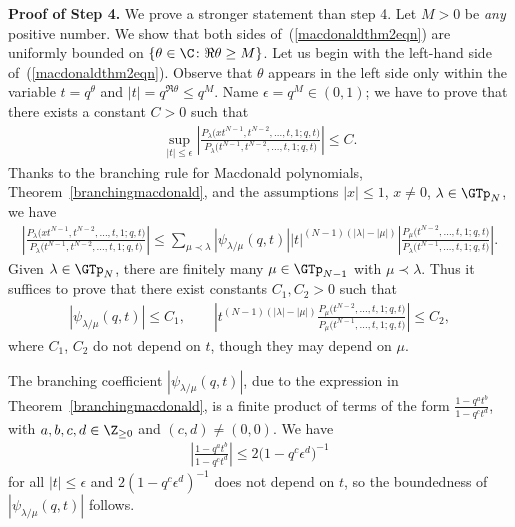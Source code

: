 \textbf{Proof of Step 4.} We prove a stronger statement than step 4. Let $M > 0$ be \textit{any} positive number. We show that both sides of~(\ref{macdonaldthm2eqn}) are uniformly bounded on $\{\theta\in\C\colon \Re\theta \geq M\}$. Let us begin with the left-hand side of~(\ref{macdonaldthm2eqn}). Observe that $\theta$ appears in the left side only within the variable $t = q^{\theta}$ and $|t| = q^{\Re\theta} \leq q^M$. Name $\epsilon = q^M\in (0, 1)$; we have to prove that there exists a constant $C > 0$ such that
\begin{gather*}
\sup_{|t| \leq \epsilon}{\left| \frac{P_{\lambda}\big(xt^{N-1}, t^{N-2}, \dots, t, 1; q, t\big)}{P_{\lambda}\big(t^{N-1}, t^{N-2}, \dots, t, 1; q, t\big)} \right|} \leq C.
\end{gather*}
Thanks to the branching rule for Macdonald polynomials, Theorem~\ref{branchingmacdonald}, and the assumptions $|x|\leq 1$, $x \neq 0$, $\lambda\in\GTp_N$, we have
\begin{gather*}
\left| \frac{P_{\lambda}\big(xt^{N-1}, t^{N-2}, \dots, t, 1; q, t\big)}{P_{\lambda}\big(t^{N-1}, t^{N-2}, \dots, t, 1; q, t\big)} \right| \leq \sum_{\mu\prec\lambda}{|\psi_{\lambda/\mu}(q, t)| |t|^{(N-1)(|\lambda| - |\mu|)} \left| \frac{P_{\mu}\big(t^{N-2}, \dots, t, 1; q, t\big)}{P_{\lambda}\big(t^{N-1}, \dots, t, 1; q, t\big)} \right| }.
\end{gather*}
Given $\lambda\in\GTp_N$, there are f\/initely many $\mu\in\GTp_{N-1}$ with $\mu\prec\lambda$. Thus it suf\/f\/ices to prove that there exist constants $C_1, C_2 > 0$ such that
\begin{gather*}
|\psi_{\lambda/\mu}(q, t)| \leq C_1, \qquad \left| t^{(N-1)(|\lambda| - |\mu|)}\frac{P_{\mu}\big(t^{N-2}, \dots, t, 1; q, t\big)}{P_{\mu}\big(t^{N-1}, \dots, t, 1; q, t\big)} \right| \leq C_2,
\end{gather*}
where $C_1$, $C_2$ do not depend on $t$, though they may depend on $\mu$.

The branching coef\/f\/icient $|\psi_{\lambda/\mu}(q, t)|$, due to the expression in Theorem~\ref{branchingmacdonald}, is a f\/inite product of terms of the form $\frac{1 - q^at^b}{1 - q^ct^d}$, with $a, b, c, d\in\Z_{\geq 0}$ and $(c, d)\neq (0, 0)$. We have{\samepage
\begin{gather*}
\left| \frac{1 - q^at^b}{1 - q^ct^d} \right| \leq 2\big(1 - q^c\epsilon^d\big)^{-1}
\end{gather*}
for all $|t|\leq\epsilon$ and $2(1 - q^c\epsilon^d)^{-1}$ does not depend on $t$, so the boundedness of $|\psi_{\lambda/\mu}(q, t)|$ follows.}

